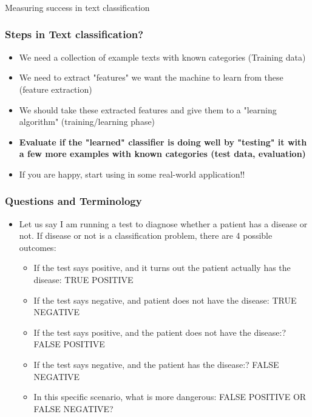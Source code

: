 \documentclass{beamer}
\begin{document}
\begin{frame}
\frametitle{}
\begin{center}
\Large Measuring success in text classification
\end{center}
\end{frame}

\begin{frame}
\frametitle{Steps in Text classification?}
\begin{itemize}
\item We need a collection of example texts with known categories (Training data)
\item We need to extract "features" we want the machine to learn from these (feature extraction)
\item We should take these extracted features and give them to a "learning algorithm" (training/learning phase)
\item \textbf{Evaluate if the "learned" classifier is doing well by "testing" it with a few more examples with known categories (test data, evaluation)}
\item If you are happy, start using in some real-world application!!
\end{itemize}
\end{frame}

\begin{frame}
\frametitle{Questions and Terminology}
\begin{itemize}
\item Let us say I am running a test to diagnose whether a patient has a disease or not. If disease or not is a classification problem, there are 4 possible outcomes: 
\begin{itemize}
\item If the test says positive, and it turns out the patient actually has the disease: TRUE POSITIVE
\item If the test says negative, and patient does not have the disease: TRUE NEGATIVE 
\item If the test says positive, and the patient does not have the disease:? \pause FALSE POSITIVE
\item If the test says negative, and the patient has the disease:? \pause FALSE NEGATIVE
\item In this specific scenario, what is more dangerous: FALSE POSITIVE OR FALSE NEGATIVE? 
\end{itemize}
\end{itemize}
\end{frame}
\end{document}
